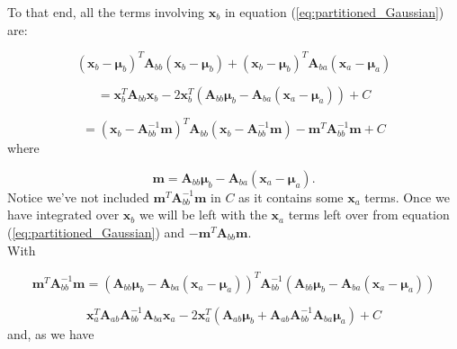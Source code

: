 \documentclass[a4paper, 11pt]{article}
\begin{document}
 To that end, all the terms involving $\boldsymbol{x}_b$ in equation (\ref{eq:partitioned_Gaussian}) are:

\begin{equation}
(\boldsymbol{x}_b-\boldsymbol{\mu}_b)^T \boldsymbol{A}_{bb} (\boldsymbol{x}_b-\boldsymbol{\mu}_b) +
(\boldsymbol{x}_b-\boldsymbol{\mu}_b)^T \boldsymbol{A}_{ba} (\boldsymbol{x}_a-\boldsymbol{\mu}_a)
\end{equation}

\begin{equation}
= \boldsymbol{x}_b^T \boldsymbol{A}_{bb} \boldsymbol{x}_b - 2\boldsymbol{x}_b^T\left( \boldsymbol{A}_{bb}\boldsymbol{\mu}_b - \boldsymbol{A}_{ba}(\boldsymbol{x}_a-\boldsymbol{\mu}_a) \right) + C
\end{equation}

\begin{equation}
= (\boldsymbol{x}_b - \boldsymbol{A}_{bb}^{-1} \boldsymbol{m})^T  \boldsymbol{A}_{bb} (\boldsymbol{x}_b - \boldsymbol{A}_{bb}^{-1} \boldsymbol{m}) - \boldsymbol{m}^T\boldsymbol{A}_{bb}^{-1} \boldsymbol{m} + C
\end{equation}
where

\begin{equation}
\boldsymbol{m} = \boldsymbol{A}_{bb}\boldsymbol{\mu}_b - \boldsymbol{A}_{ba}(\boldsymbol{x}_a-\boldsymbol{\mu}_a).
\end{equation}
Notice we've not included $\boldsymbol{m}^T\boldsymbol{A}_{bb}^{-1} \boldsymbol{m}$ in $C$ as it contains some $\boldsymbol{x}_a$ terms. Once we have integrated over $\boldsymbol{x}_b$ we will be left with the $\boldsymbol{x}_a$ terms left over from equation (\ref{eq:partitioned_Gaussian}) and $-\boldsymbol{m}^T\boldsymbol{A}_{bb}\boldsymbol{m}$. \\

With

\begin{equation}
\boldsymbol{m}^T\boldsymbol{A}_{bb}^{-1} \boldsymbol{m} = \left( \boldsymbol{A}_{bb}\boldsymbol{\mu}_b - \boldsymbol{A}_{ba}(\boldsymbol{x}_a-\boldsymbol{\mu}_a) \right)^T \boldsymbol{A}_{bb}^{-1} \left( \boldsymbol{A}_{bb}\boldsymbol{\mu}_b - \boldsymbol{A}_{ba}(\boldsymbol{x}_a-\boldsymbol{\mu}_a) \right)
\end{equation}

\begin{equation}
\boldsymbol{x}_a^T \boldsymbol{A}_{ab} \boldsymbol{A}_{bb}^{-1} \boldsymbol{A}_{ba} \boldsymbol{x}_a - 2\boldsymbol{x}_a^T ( \boldsymbol{A}_{ab}\boldsymbol{\mu}_b + \boldsymbol{A}_{ab}\boldsymbol{A}_{bb}^{-1} \boldsymbol{A}_{ba} \boldsymbol{\mu}_a ) + C
\end{equation}
and, as we have
\end{document}

